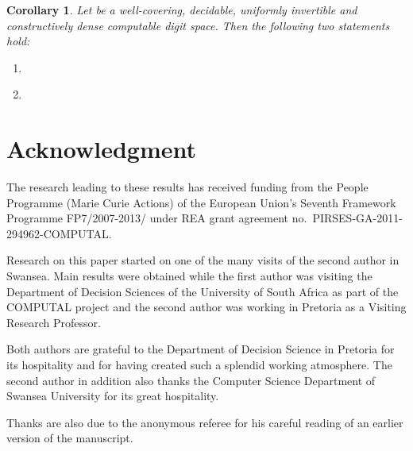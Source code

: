 \documentclass[microtype]{jloganal}
\theoremstyle{plain}
\newtheorem{corollary}[theorem]{Corollary}
\theoremstyle{definition}
\begin{document}
\begin{corollary}
\label{cor-cauchy-coind}
Let   be a well-covering, decidable, uniformly invertible and constructively dense computable digit space. Then the following two statements hold:
\begin{enumerate}
\item\label{cor-cauchy-coind-1} 

\item\label{cor-cauchy-coind-2} 

\end{enumerate}
\end{corollary}



\section*{Acknowledgment}

The research leading to these results has received funding from the People Programme (Marie Curie Actions) of the European Union's Seventh Framework Programme FP7/2007-2013/ under REA grant agreement no.\ PIRSES-GA-2011-294962-COMPUTAL.

Research on this paper started on one of the many visits of the second author in Swansea. Main results were obtained while the first author was visiting the Department of Decision Sciences of the University of South Africa as part of the COMPUTAL project  and the second author was working in Pretoria as a Visiting Research Professor. 

Both authors are grateful to the Department of Decision Science in Pretoria for its hospitality and for having created such a splendid working atmosphere. The second author in addition also thanks the Computer Science Department of Swansea University for its great hospitality.

Thanks are also due to the anonymous referee for his careful reading of an earlier version of the manuscript.


 
\end{document}
